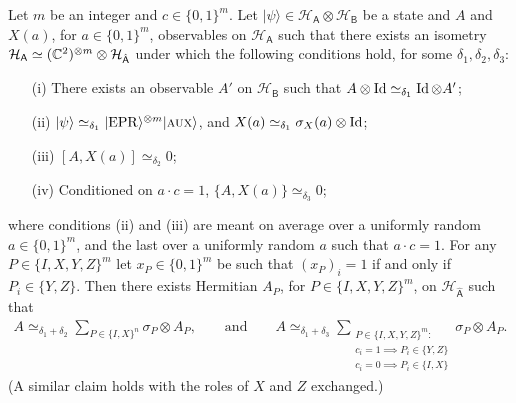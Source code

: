 \documentclass{toc}
\newcommand{\ket}[1]{|#1\rangle}
\newcommand{\Id}{\ensuremath{\mathop{\rm Id}\nolimits}}
\newcommand{\reg}[1]{{\textsf{#1}}}
\newcommand{\mH}{\mathcal{H}}
\newcommand{\EPR}{{\rm EPR}}
\newcommand{\aux}{\textsc {aux}}
\begin{document}
\begin{lemma}\label{lem:pauli-c-n}
Let $m$ be an integer and $c\in\{0,1\}^m$. Let $\ket{\psi} \in \mH_{\reg{A}} \otimes \mH_{\reg{B}}$ be a state and $A$ and $X(a)$, for $a\in\{0,1\}^m$, observables on $\mH_{\reg{A}}$ such that there exists an isometry $\mH_{\reg{A}} \simeq (\C^2)^{\otimes m}\otimes \mH_{\hat{\reg{A}}}$ under which the following conditions hold, for some $\delta_1,\delta_2,\delta_3$:
\begin{enumerate}
\item[(i)] There exists an observable $A'$ on $\mH_\reg{B}$ such that $A\otimes \Id \simeq_{\delta_1} \Id \otimes A'$;
\item[(ii)] $\ket{\psi} \simeq_{\delta_1} \ket{\EPR}^{\otimes m}\ket{\aux}$, and $X(a)\simeq_{\delta_1} \sigma_X(a) \otimes \Id$;
\item[(iii)] $[A,X(a)]\simeq_{\delta_2} 0$;
\item[(iv)] Conditioned on $a\cdot c=1$, $\{A,X(a)\} \simeq_{\delta_3} 0$;
\end{enumerate}
where conditions (ii) and (iii) are meant on average over a uniformly random
  $a\in\{0,1\}^m$, and the last over a uniformly random $a$ such that $a\cdot c
  =1$. For any $P\in\{I,X,Y,Z\}^m$ let $x_P \in\{0,1\}^m$ be such that $(x_P)_i=1$ if and only if $P_i\in\{Y,Z\}$.
Then there exists Hermitian $A_P$, for $P\in\{I,X,Y,Z\}^m$, on $\mH_{\hat{\reg{A}}}$ such that 
\begin{align}
A \simeq_{\delta_1+\delta_2} \sum_{P\in\{I,X\}^n} \sigma_P \otimes A_P,\qquad\text{and}\qquad A \simeq_{\delta_1+\delta_3} \sum_{\substack{P\in\{I,X,Y,Z\}^m:\\ c_i=1 \implies P_i \in \{Y,Z\}\\  c_i=0 \implies P_i \in \{I,X\}}} \sigma_P \otimes A_P.\label{eq:la6}
\end{align}
 (A similar claim holds with the roles of $X$ and $Z$ exchanged.)
\end{lemma}
\end{document}
